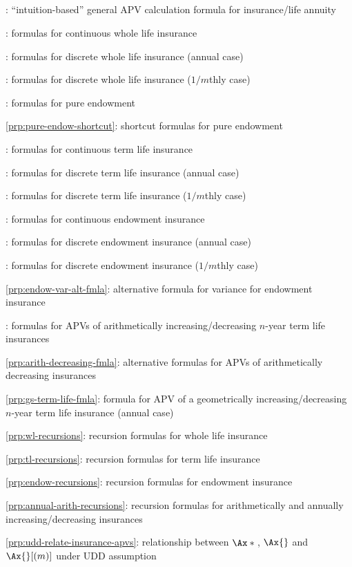 \subsection*{}
\item {}: ``intuition-based'' general APV calculation formula for insurance/life annuity
\item {}: formulas for continuous whole life insurance
\item {}: formulas for discrete whole life insurance (annual case)
\item {}: formulas for discrete whole life insurance (\(1/m\)thly case)
\item {}: formulas for pure endowment
\item \cref{prp:pure-endow-shortcut}: shortcut formulas for pure endowment
\item {}: formulas for continuous term life insurance
\item {}: formulas for discrete term life insurance (annual case)
\item {}: formulas for discrete term life insurance (\(1/m\)thly case)
\item {}: formulas for continuous endowment insurance
\item {}: formulas for discrete endowment insurance (annual case)
\item {}: formulas for discrete endowment insurance (\(1/m\)thly case)
\item \cref{prp:endow-var-alt-fmla}: alternative formula for variance for endowment insurance
\item {}: formulas for APVs of arithmetically increasing/decreasing \(n\)-year term life insurances
\item \cref{prp:arith-decreasing-fmla}: alternative formulas for APVs of arithmetically decreasing insurances
\item \cref{prp:gs-term-life-fmla}: formula for APV of a geometrically
increasing/decreasing \(n\)-year term life insurance (annual case)
\item \cref{prp:wl-recursions}: recursion formulas for whole life insurance
\item \cref{prp:tl-recursions}: recursion formulas for term life insurance
\item \cref{prp:endow-recursions}: recursion formulas for endowment insurance
\item \cref{prp:annual-arith-recursions}: recursion formulas for arithmetically
and annually increasing/decreasing insurances
\item \cref{prp:udd-relate-insurance-apvs}: relationship between \(\Ax*{}\),
\(\Ax{}\) and \(\Ax{}[(m)]\) under UDD assumption
